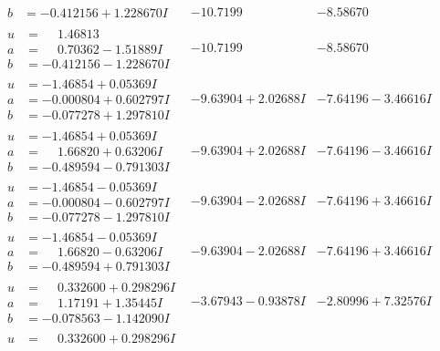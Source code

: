 \documentclass[1p]{elsarticle_modified}
\theoremstyle{definition}
\begin{document}
$$\begin{array}{c|c|c}
\begin{aligned}
b &= -0.412156 + 1.228670 I\end{aligned}
 & -10.7199\phantom{ +0.000000I} & -8.58670\phantom{ +0.000000I} \\ \hline\begin{aligned}
u &= \phantom{-}1.46813\phantom{ +0.000000I} \\
a &= \phantom{-}0.70362 - 1.51889 I \\
b &= -0.412156 - 1.228670 I\end{aligned}
 & -10.7199\phantom{ +0.000000I} & -8.58670\phantom{ +0.000000I} \\ \hline\begin{aligned}
u &= -1.46854 + 0.05369 I \\
a &= -0.000804 + 0.602797 I \\
b &= -0.077278 + 1.297810 I\end{aligned}
 & -9.63904 + 2.02688 I & -7.64196 - 3.46616 I \\ \hline\begin{aligned}
u &= -1.46854 + 0.05369 I \\
a &= \phantom{-}1.66820 + 0.63206 I \\
b &= -0.489594 - 0.791303 I\end{aligned}
 & -9.63904 + 2.02688 I & -7.64196 - 3.46616 I \\ \hline\begin{aligned}
u &= -1.46854 - 0.05369 I \\
a &= -0.000804 - 0.602797 I \\
b &= -0.077278 - 1.297810 I\end{aligned}
 & -9.63904 - 2.02688 I & -7.64196 + 3.46616 I \\ \hline\begin{aligned}
u &= -1.46854 - 0.05369 I \\
a &= \phantom{-}1.66820 - 0.63206 I \\
b &= -0.489594 + 0.791303 I\end{aligned}
 & -9.63904 - 2.02688 I & -7.64196 + 3.46616 I \\ \hline\begin{aligned}
u &= \phantom{-}0.332600 + 0.298296 I \\
a &= \phantom{-}1.17191 + 1.35445 I \\
b &= -0.078563 - 1.142090 I\end{aligned}
 & -3.67943 - 0.93878 I & -2.80996 + 7.32576 I \\ \hline\begin{aligned}
u &= \phantom{-}0.332600 + 0.298296 I \\

\end{aligned}
\end{array}$$
\end{document}
